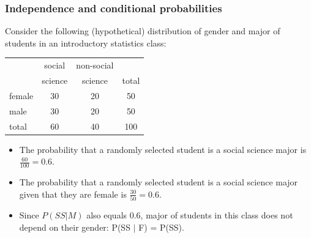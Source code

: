 \documentclass[notes,11pt, aspectratio=169]{beamer}
\begin{document}
\begin{frame}
\frametitle{Independence and conditional probabilities}

Consider the following (hypothetical) distribution of gender and major of students in an introductory statistics class:

{\small
\begin{center}
\begin{tabular}{l | c c | c}
			& social	& non-social 		&  \\
			& science	& science	& total \\
\hline
female		& 30		& 20		& 50 \\
male			& 30		& 20		& 50 \\
\hline
total			& 60		& 40		& 100
\end{tabular}
\end{center}
}

\pause

\begin{itemize}

\item The probability that a randomly selected student is a social science major is \pause $\frac{60}{100} = 0.6$. 

\pause

\item The probability that a randomly selected student is a social science major given that they are female is \pause $\frac{30}{50} = 0.6$. 

\pause

\item Since $P(SS | M)$ also equals 0.6, major of students in this class does not depend on their gender: P(SS $|$ F) = P(SS).

\end{itemize}

\end{frame}

\end{document}

